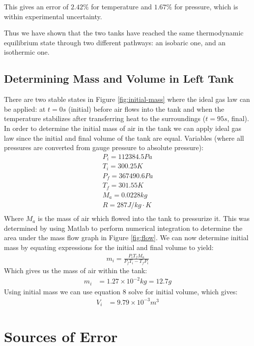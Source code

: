 \documentclass[titlepage, twocolumn, 12pt]{article}
\begin{document}
This gives an error of \(2.42\%\) for temperature and \(1.67\%\) for pressure, which is within experimental uncertainty.

Thus we have shown that the two tanks have reached the same thermodynamic equilibrium state through two different pathways: an isobaric one, and an isothermic one.

\subsection{Determining Mass and Volume in Left Tank}

There are two stable states in Figure \ref{fig:initial-mass} where the ideal gas law can be applied: at $t=0s$ (initial) before air flows into the tank and when the temperature stabilizes after transferring heat to the surroundings ($t=95s$, final).
In order to determine the initial mass of air in the tank we can apply ideal gas law since the initial and final volume of the tank are equal. Variables (where all pressures are converted from gauge pressure to absolute pressure):
\begin{align*}
    P_i = 112384.5 Pa\\
    T_i = 300.25 K \\
    P_f = 367490.6 Pa\\
    T_f = 301.55 K \\
    M_a = 0.0228 kg\\
    R =  287 J/kg·K \\
\end{align*}
Where \(M_a\) is the mass of air which flowed into the tank to pressurize it. This was determined by using Matlab to perform numerical integration to determine the area under the mass flow graph in Figure \ref{fig:flow}.
We can now determine initial mass by equating expressions for the initial and final volume to yield:
\begin{align}
    m_i = \frac{P_iT_fM_a}{P_fT_i-T_fP_i}
\end{align}
Which gives us the mass of air within the tank:
\begin{align*}
    m_i &= 1.27\times10^{-2}kg = 12.7g
\end{align*}
Using initial mass we can use equation 8 solve for initial volume, which gives:
\begin{align*}
V_i &= 9.79\times10^{-3}m^3
\end{align*}

\section{Sources of Error}
\vspace{-0.5cm}
\end{document}
